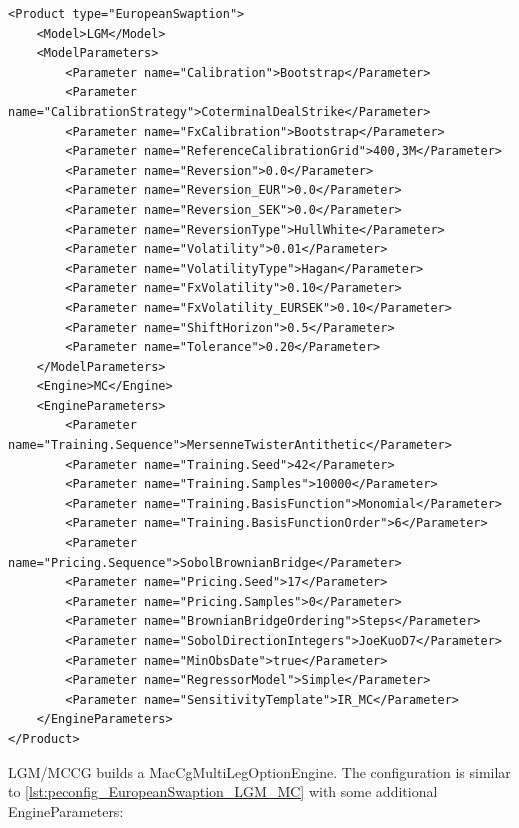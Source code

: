 \begin{longlisting}
\begin{verbatim}
<Product type="EuropeanSwaption">
    <Model>LGM</Model>
    <ModelParameters>
        <Parameter name="Calibration">Bootstrap</Parameter>
        <Parameter name="CalibrationStrategy">CoterminalDealStrike</Parameter>
        <Parameter name="FxCalibration">Bootstrap</Parameter>
        <Parameter name="ReferenceCalibrationGrid">400,3M</Parameter>
        <Parameter name="Reversion">0.0</Parameter>
        <Parameter name="Reversion_EUR">0.0</Parameter>
        <Parameter name="Reversion_SEK">0.0</Parameter>
        <Parameter name="ReversionType">HullWhite</Parameter>
        <Parameter name="Volatility">0.01</Parameter>
        <Parameter name="VolatilityType">Hagan</Parameter>
        <Parameter name="FxVolatility">0.10</Parameter>
        <Parameter name="FxVolatility_EURSEK">0.10</Parameter>
        <Parameter name="ShiftHorizon">0.5</Parameter>
        <Parameter name="Tolerance">0.20</Parameter>
    </ModelParameters>
    <Engine>MC</Engine>
    <EngineParameters>
        <Parameter name="Training.Sequence">MersenneTwisterAntithetic</Parameter>
        <Parameter name="Training.Seed">42</Parameter>
        <Parameter name="Training.Samples">10000</Parameter>
        <Parameter name="Training.BasisFunction">Monomial</Parameter>
        <Parameter name="Training.BasisFunctionOrder">6</Parameter>
        <Parameter name="Pricing.Sequence">SobolBrownianBridge</Parameter>
        <Parameter name="Pricing.Seed">17</Parameter>
        <Parameter name="Pricing.Samples">0</Parameter>
        <Parameter name="BrownianBridgeOrdering">Steps</Parameter>
        <Parameter name="SobolDirectionIntegers">JoeKuoD7</Parameter>
        <Parameter name="MinObsDate">true</Parameter>
        <Parameter name="RegressorModel">Simple</Parameter>
        <Parameter name="SensitivityTemplate">IR_MC</Parameter>
    </EngineParameters>
</Product>
\end{verbatim}
\caption{Configuration for Product EuropeanSwaption, Model LGM, Engine MC}
\label{lst:peconfig_EuropeanSwaption_LGM_MC}
\end{longlisting}

LGM/MCCG builds a MacCgMultiLegOptionEngine. The configuration is similar to \ref{lst:peconfig_EuropeanSwaption_LGM_MC}
with some additional EngineParameters:

